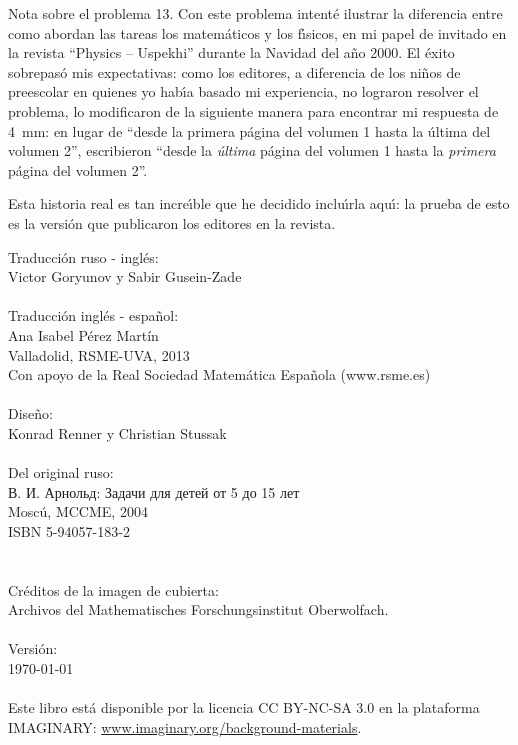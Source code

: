 \begin{note}{Nota sobre el problema 13.}
	Con este problema intent\'e ilustrar la diferencia entre como abordan las tareas los matem\'aticos y los f\'{\i}sicos, en mi papel de invitado en la revista \enquote{Physics -- Uspekhi}  durante la Navidad del a\~no 2000. El \'exito sobrepas\'o mis expectativas: como los editores, a diferencia de los ni\~nos de preescolar en quienes yo hab\'{\i}a basado mi experiencia, no lograron resolver el problema, lo modificaron de la siguiente manera para encontrar mi respuesta de \SI{4}{\mm}: en lugar de \enquote{desde la primera p\'agina del volumen 1 hasta la \'ultima del volumen 2},  escribieron \enquote{desde la {\em \'ultima\/} p\'agina del volumen 1 hasta la {\em primera\/} p\'agina del volumen 2}.

	Esta historia real es tan incre\'{\i}ble que he decidido inclu\'{\i}rla aqu\'{\i}: la prueba de esto es la versi\'on que publicaron los editores en la revista.
\end{note}
\clearpage
\null\vfill
\noindent
Traducci\'on ruso - ingl\'es:\\
\null\quad Victor Goryunov y Sabir Gusein-Zade\\
\\
Traducci\'on ingl\'es - espa\~{n}ol:\\
\null\quad Ana Isabel P\'erez Mart\'in\\
\null\quad Valladolid, RSME-UVA, 2013\\
\null\quad Con apoyo de la Real Sociedad Matem\'atica Espa\~{n}ola (www.rsme.es)\\
\\
Diseño:\\
\null\quad Konrad Renner y Christian Stussak\\
\\
Del original ruso:\\
\null\quad \textrussian{В. И. Арнольд: Задачи для детей от 5 до 15 лет}\\
\null\quad Mosc\'u, MCCME, 2004\\
\null\quad ISBN 5-94057-183-2\\
\\
\\
Cr\'editos de la imagen de cubierta:\\
\null\quad Archivos del Mathematisches Forschungsinstitut Oberwolfach.\\
\\
Versión:\\
\null\quad \today\\
\\
Este libro est\'a disponible por la licencia CC BY-NC-SA 3.0 en la plataforma IMAGINARY: \href{http://www.imaginary.org/background-materials}{www.imaginary.org/background-materials}.


